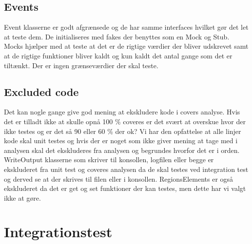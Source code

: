 \subsection{Events}
Event klasserne er godt afgrænsede og de har samme interfaces hvilket gør det let at teste dem. De initialiseres med fakes der benyttes som en Mock og Stub. Mocks hjælper med at teste at det er de rigtige værdier der bliver udskrevet samt at de rigtige funktioner bliver kaldt og kun kaldt det antal gange som det er tiltænkt. Der er ingen grænseværdier der skal teste.

\subsection{Excluded code}
Det kan nogle gange give god mening at ekskludere kode i covers analyse. Hvis det er tilladt ikke at skulle opnå 100 \% coveres er det svært at overskue hvor der ikke testes og er det så 90 eller 60 \% der ok? Vi har den opfattelse at alle linjer kode skal unit testes og hvis der er noget som ikke giver mening at tage med i analysen skal det ekskluderes fra analysen og begrundes hvorfor det er i orden.
WriteOutput klasserne som skriver til konsollen, logfilen eller begge er ekskluderet fra unit test og coveres analysen da de skal testes ved integration test og derved se at der skrives til filen eller i konsollen. 
RegionsElements er også ekskluderet da det er get og set funktioner der kan testes, men dette har vi valgt ikke at gøre.

\section{Integrationstest}

